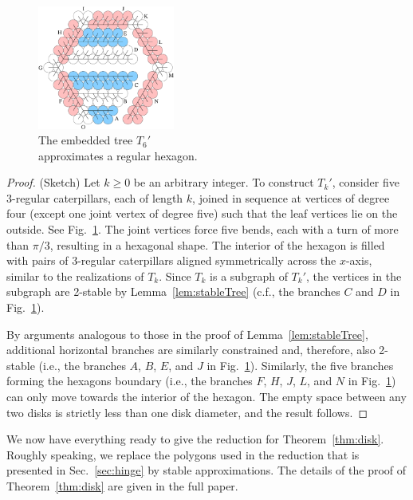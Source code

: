 \documentclass[runningheads]{article}
\begin{document}
\begin{figure}
\vspace{-3\baselineskip}
    \centering
	\includegraphics[width=0.4\textwidth]{block3c}
\caption{The embedded tree $T_6'$\\ approximates a regular hexagon.}
\label{fig:hexagons}
\end{figure}
\begin{proof} (Sketch)
Let $k\geq 0$ be an arbitrary integer. To construct $T_k'$, consider five 3-regular
caterpillars, each of length $k$, joined in sequence at vertices of degree four
(except one joint vertex of degree five)
such that the leaf vertices lie on the outside. See Fig.~\ref{fig:hexagons}.
The joint vertices force five bends, each with a turn of more than $\pi/3$,
resulting in a hexagonal shape. The interior of the hexagon is filled
with pairs of 3-regular caterpillars aligned symmetrically across the
$x$-axis, similar to the realizations of $T_k$.
Since $T_k$ is a subgraph of $T_k'$,
the vertices in the subgraph are 2-stable
by Lemma~\ref{lem:stableTree} (c.f., the branches $C$ and $D$ in Fig.~\ref{fig:hexagons}).

By arguments analogous to those in the proof of Lemma~\ref{lem:stableTree},
additional horizontal branches are similarly constrained and, therefore,
also 2-stable (i.e., the branches $A$, $B$, $E$, and $J$ in Fig.~\ref{fig:hexagons}).
Similarly, the five branches forming the hexagons boundary (i.e., the branches $F$, $H$, $J$, $L$,
and $N$ in Fig.~\ref{fig:hexagons}) can only move towards the interior of the hexagon.
The empty space between any two disks is strictly less than one disk diameter,
and the result follows.
\end{proof}

We now have everything ready to give the reduction for Theorem~\ref{thm:disk}. Roughly speaking, we replace the polygons used in the reduction
that is presented in Sec.~\ref{sec:hinge} by stable approximations. The details of the proof of Theorem~\ref{thm:disk} are given in the full paper.%
\end{document}
